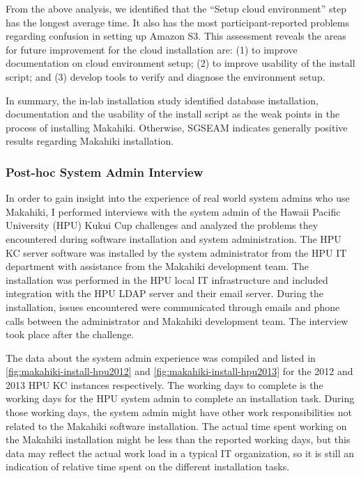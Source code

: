 From the above analysis, we identified that the ``Setup cloud environment'' step has the
longest average time. It also has the most participant-reported problems regarding confusion in setting up Amazon S3. This assessment reveals the areas for future improvement for the cloud installation are: (1) to improve documentation on cloud environment setup; (2) to improve usability of the install script; and (3) develop tools to verify and diagnose the environment setup.

In summary, the in-lab installation study identified database installation, documentation and the usability of the install script as the weak points in the process of installing Makahiki.  Otherwise, SGSEAM indicates generally positive results regarding Makahiki installation.

\subsubsection{Post-hoc System Admin Interview}
\label{sec:sysadmin-interview-result}

In order to gain insight into the experience of real world system admins who use Makahiki, I performed interviews with the system admin of the Hawaii Pacific University (HPU) Kukui Cup challenges and analyzed the problems they encountered during software installation and system administration. The HPU KC server software was installed by the system administrator from the HPU IT department with assistance from the Makahiki development team. The installation was performed in the HPU local IT infrastructure and included integration with the HPU LDAP server and their email server.  During the installation, issues encountered were communicated through emails and phone calls between the administrator and Makahiki development team. The interview took place after the challenge. 

The data about the system admin experience was compiled and listed in \autoref{fig:makahiki-install-hpu2012} and \autoref{fig:makahiki-install-hpu2013} for the 2012 and 2013 HPU KC instances respectively. The working days to complete is the working days for the HPU system admin to complete an  installation task. During those working days, the system admin might have other work responsibilities not related to the Makahiki software installation. The actual time spent working on the Makahiki installation might be less than the reported working days, but this data may reflect the actual work load in a typical IT organization, so it is still an indication of relative time spent on the different installation tasks.

